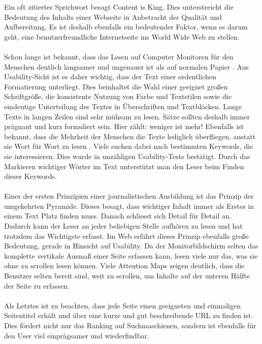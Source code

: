 Ein oft zitiertes Sprichwort besagt \glqq Content is King\grqq{}. Dies unterstreicht die Bedeutung des Inhalts einer Webseite in Anbetracht der Qualität und Aufbereitung. Es ist deshalb ebenfalls ein bedeutender Faktor, wenn es darum geht, eine benutzerfreundliche Internetseite ins World Wide Web zu stellen.\\
\\
Schon lange ist bekannt, dass das Lesen auf Computer Monitoren für den Menschen deutlich langsamer und ungenauer ist als auf normalen Papier \cite{screenvspaper}. Aus Usability-Sicht ist es daher wichtig, dass der Text einer ordentlichen Formatierung unterliegt. Dies beinhaltet die Wahl einer geeignet großen Schriftgröße, die konsistente Nutzung von Farbe und Textstilen sowie die eindeutige Unterteilung des Textes in Überschriften und Textblöcken. Lange Texte in langen Zeilen sind sehr mühsam zu lesen. Sätze sollten deshalb immer prägnant und kurz formuliert sein. Hier zählt: weniger ist mehr! Ebenfalls ist bekannt, dass die Mehrheit der Menschen die Texte lediglich überfliegen, anstatt sie Wort für Wort zu lesen \cite{howtoreadinweb}. Viele suchen dabei nach bestimmten Keywords, die sie interessieren. Dies wurde in unzähligen Usability-Tests bestätigt. Durch das Markieren wichtiger Wörter im Text unterstützt man den Leser beim Finden dieser Keywords.\\
\\
Einer der ersten Prinzipien einer journalistischen Ausbildung ist das Prinzip der \glqq umgekehrten Pyramide\grqq{}. Dieses besagt, dass wichtiger Inhalt immer als Erstes in einem Text Platz finden muss. Danach schliesst sich Detail für Detail an. Dadurch kann der Leser an jeder beliebigen Stelle aufhören zu lesen und hat trotzdem das Wichtigste erfasst. Im Web erfährt dieses Prinzip ebenfalls große Bedeutung, gerade in Hinsicht auf Usability. Da der Monitorbildschirm selten das komplette vertikale Ausmaß einer Seite erfassen kann, lesen viele nur das, was sie ohne zu scrollen lesen können. Viele Attention Maps zeigen deutlich, dass die Benutzer selten bereit sind, weit zu scrollen, um Inhalte auf der unteren Hälfte der Seite zu erfassen.\\
\\
Als Letztes ist zu beachten, dass jede Seite einen geeigneten und einmaligen Seitentitel erhält und über eine kurze und gut beschreibende URL zu finden ist. Dies fördert nicht nur das Ranking auf Suchmaschienen, sondern ist ebenfalls für den User viel einprägsamer und wiederfindbar.